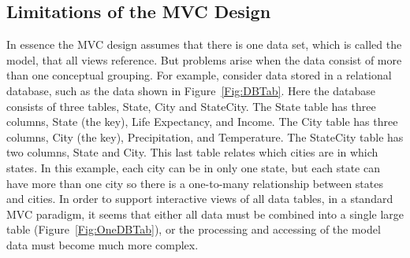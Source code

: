 \documentclass[11pt]{article}
\newcommand{\Rpackage}[1]{{\textit{#1}}}
\begin{document}

\subsection{Limitations of the MVC Design}\label{Ssec:Limit}

In essence the MVC design assumes that there is one data set, which is
called the model, that all views reference.  But problems arise when
the data consist of more than one conceptual grouping.  For example,
consider data stored in a relational database, such as the data shown in
Figure~\ref{Fig:DBTab}.  Here the database
consists of three tables, State, City and StateCity.  The State table
has three columns, State (the key), Life Expectancy, and Income.  The
City table has three columns, City (the key), Precipitation, and
Temperature.  The StateCity table has two columns, State and City.
This last table relates which cities are in which states.  In this
example, each city can be in only one state, but each state can have
more than one city so there is a one-to-many relationship between
states and cities.  In order to support interactive views of all data
tables, in a standard MVC paradigm, it seems that either all data must
be combined into a single large table (Figure~\ref{Fig:OneDBTab}), or
the processing and accessing of the model data must become much more
complex. 

\end{document}
